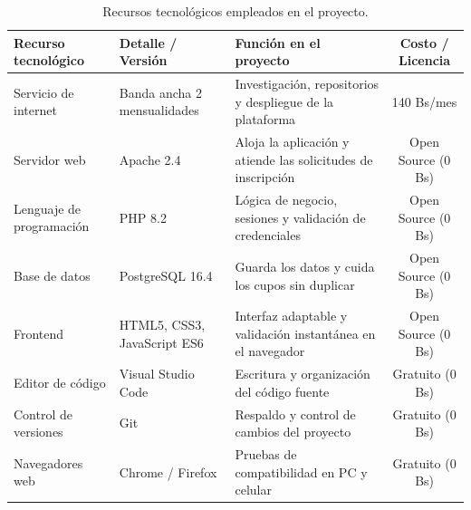 \begin{table}[htbp]
    \centering
    \caption{Recursos tecnológicos empleados en el proyecto.}
    \label{tab:recursos_tecnologicos}
    \renewcommand{\arraystretch}{1.30}
    \begin{tabularx}{\textwidth}{L L L C}
        \toprule
        \textbf{Recurso tecnológico} & \textbf{Detalle / Versión} & \textbf{Función en el proyecto} & \textbf{Costo / Licencia} \\
        \midrule
        Servicio de internet & Banda ancha 2 mensualidades & Investigación, repositorios y despliegue de la plataforma & 140 Bs/mes \\
        Servidor web & Apache 2.4 & Aloja la aplicación y atiende las solicitudes de inscripción & Open Source (0 Bs) \\
        Lenguaje de programación & PHP 8.2 & Lógica de negocio, sesiones y validación de credenciales & Open Source (0 Bs) \\
        Base de datos & PostgreSQL 16.4 & Guarda los datos y cuida los cupos sin duplicar & Open Source (0 Bs) \\
        Frontend & HTML5, CSS3, JavaScript ES6 & Interfaz adaptable y validación instantánea en el navegador & Open Source (0 Bs) \\
        Editor de código & Visual Studio Code & Escritura y organización del código fuente & Gratuito (0 Bs) \\
        Control de versiones & Git & Respaldo y control de cambios del proyecto & Gratuito (0 Bs) \\
        Navegadores web & Chrome / Firefox & Pruebas de compatibilidad en PC y celular & Gratuito (0 Bs) \\
        \bottomrule
    \end{tabularx}
\end{table}

